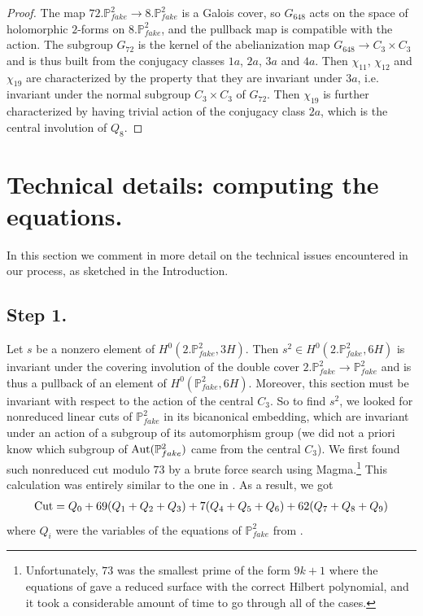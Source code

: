 \documentclass[11pt,reqno]{amsart}
\def\P {{\mathbb P}}
\def\FPP {{\P^2_{fake}}}
\theoremstyle{definition}
\numberwithin{equation}{section}
\begin{document}
\begin{proof}
The map  $72.\FPP\to 8.\FPP$ is a Galois cover, so $G_{648}$ acts on the space of holomorphic $2$-forms on $8.\FPP$, and the pullback map is compatible with the action. The subgroup $G_{72}$ is the kernel of the abelianization map $G_{648}\to C_3\times C_3$ and is thus built from the conjugacy classes $1a$, $2a$, $3a$ and $4a$. Then $\chi_{11}$, $\chi_{12}$ and $\chi_{19}$ are characterized by the property that they are invariant under $3a$, i.e. invariant under the normal subgroup $C_3\times C_3$ of $G_{72}$. Then $\chi_{19}$ is further characterized by having trivial action of the conjugacy class $2a$, which is the central involution of $Q_8$.
\end{proof}

\section{Technical details: computing the equations.}

In this section we comment  in more detail on the technical issues encountered in our process, as sketched in the Introduction.

\subsection{Step 1.}
Let $s$ be a nonzero element of $H^0(2.\FPP,3H)$. Then $s^2\in H^0(2.\FPP,6H)$ is invariant under the covering involution of the double cover $2.\FPP\to \FPP$ and is thus a pullback of an element of $H^0(\FPP,6H)$. Moreover, this section must be invariant with respect to the action of the central $C_3$. So to find $s^2$, we looked for nonreduced linear cuts of $\FPP$ in its bicanonical embedding, which are invariant under an action of a subgroup of its automorphism group (we did not a priori know which subgroup of ${\rm Aut}(\FPP)$ came from the central $C_3$). We first found such nonreduced cut modulo $73$ by a brute force search using Magma.\footnote{Unfortunately, $73$ was the smallest prime of the form $9k+1$ where the equations of \cite{BBF} gave a reduced surface with the correct Hilbert polynomial, and it took a considerable amount of time to go through all of the cases.} This calculation was entirely similar to the one in \cite{B21,BJLM,BL}. As a result,
we got 
\begin{align}\label{cut}
\begin{array}{c}
{\rm Cut}= Q_0 + 69 (Q_1 +  Q_2 +  Q_3) + 7 (Q_4 +  Q_5 + Q_6) + 62( Q_7 + Q_8 + 
 Q_9)
\end{array}
\end{align}
where $Q_i$ were the variables of the equations of $\FPP$ from \cite{BBF}.
\end{document}

